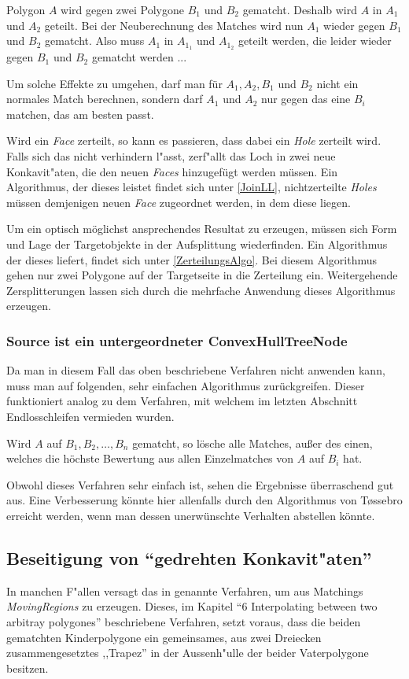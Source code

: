 Polygon $A$ wird gegen zwei Polygone $B_1$ und $B_2$ gematcht. Deshalb wird $A$ in $A_1$ und $A_2$ geteilt. Bei der Neuberechnung des Matches wird nun $A_1$ wieder gegen $B_1$  und $B_2$ gematcht. Also muss $A_1$ in $A_{1_1}$ und $A_{1_2}$ geteilt werden, die leider wieder gegen $B_1$ und $B_2$ gematcht werden ...

Um solche Effekte zu umgehen, darf man für $A_1, A_2,B_1$ und $B_2$ nicht ein normales Match berechnen, sondern darf $A_1$ und $A_2$ nur gegen das eine $B_i$ matchen, das am besten passt. 

Wird ein \textit{Face} zerteilt, so kann es passieren, dass dabei ein \textit{Hole} zerteilt wird. Falls sich das nicht verhindern l"asst, zerf"allt das Loch in zwei neue Konkavit"aten, die den neuen \textit{Faces} hinzugefügt werden müssen. Ein Algorithmus, der dieses leistet findet sich unter \vref{JoinLL}, nichtzerteilte \textit{Holes} müssen demjenigen neuen \textit{Face} zugeordnet werden, in dem diese liegen.

Um ein optisch möglichst ansprechendes Resultat zu erzeugen, müssen sich Form und Lage der Targetobjekte in der Aufsplittung wiederfinden. Ein Algorithmus der dieses liefert, findet sich unter \vref{ZerteilungsAlgo}. Bei diesem Algorithmus gehen nur zwei Polygone auf der Targetseite in die Zerteilung ein. Weitergehende Zersplitterungen lassen sich durch die mehrfache Anwendung dieses Algorithmus erzeugen.

\subsubsection*{Source ist ein untergeordneter ConvexHullTreeNode}

Da man in diesem Fall das oben beschriebene Verfahren nicht anwenden kann, muss man auf folgenden, sehr einfachen Algorithmus zurückgreifen. Dieser  funktioniert analog zu dem Verfahren, mit welchem im letzten Abschnitt Endlosschleifen vermieden wurden.

Wird $A$ auf  $B_1,B_2, \hdots ,B_n$ gematcht, so lösche alle Matches, außer des einen, welches die höchste Bewertung aus allen Einzelmatches von $A$ auf $B_i$ hat.

Obwohl dieses Verfahren sehr einfach ist, sehen die Ergebnisse überraschend gut aus. Eine Verbesserung könnte hier allenfalls durch den Algorithmus von T\o{}ssebro erreicht werden, wenn man dessen unerwünschte Verhalten abstellen könnte.

\subsection{Beseitigung von "`gedrehten Konkavit"aten"'}\label{gedrehtKon}
In manchen F"allen versagt das in \cite{TG} genannte Verfahren, um aus Matchings \textit{MovingRegions} zu erzeugen. Dieses, im Kapitel "`6 Interpolating between two arbitray polygones"' beschriebene Verfahren, setzt voraus, dass die beiden gematchten Kinderpolygone ein gemeinsames, aus zwei Dreiecken zusammengesetztes ,,Trapez'' in der Aussenh"ulle der beider Vaterpolygone besitzen. 


